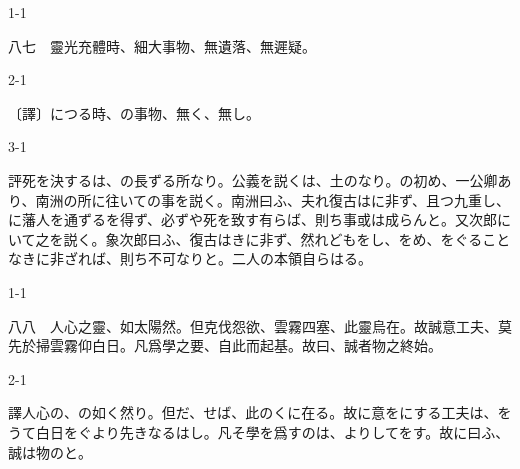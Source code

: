 \documentclass[tate,paper=b6j,jafontsize=9pt]{jlreq}
\begin{document}
\begin{azconvIndented}{1\zw}{-1\zw}

八七　靈光充體時、細大事物、無遺落、無遲疑。

\end{azconvIndented}
\begin{azconvIndented}{2\zw}{-1\zw}

〔譯〕につる時、の事物、無く、無し。

\end{azconvIndented}
\begin{azconvIndented}{3\zw}{-1\zw}

評死を決するは、の長ずる所なり。公義を説くは、土のなり。の初め、一公卿あり、南洲の所に往いての事を説く。南洲曰ふ、夫れ復古はに非ず、且つ九重し、に藩人を通ずるを得ず、必ずや死を致す有らば、則ち事或は成らんと。又次郎にいて之を説く。象次郎曰ふ、復古はきに非ず、然れどもをし、をめ、をぐることなきに非ざれば、則ち不可なりと。二人の本領自らはる。

\end{azconvIndented}

\begin{azconvIndented}{1\zw}{-1\zw}

八八　人心之靈、如太陽然。但克伐怨欲、雲霧四塞、此靈烏在。故誠意工夫、莫先於掃雲霧仰白日。凡爲學之要、自此而起基。故曰、誠者物之終始。

\end{azconvIndented}
\begin{azconvIndented}{2\zw}{-1\zw}

譯人心の、の如く然り。但だ、せば、此のくに在る。故に意をにする工夫は、をうて白日をぐより先きなるはし。凡そ學を爲すのは、よりしてをす。故に曰ふ、誠は物のと。

\end{azconvIndented}
\end{document}
